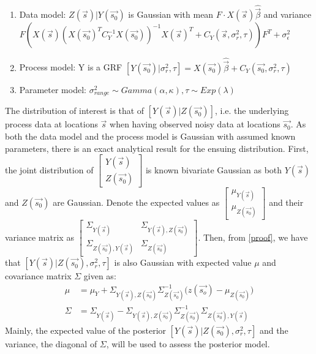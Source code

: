 \documentclass{report}
\begin{document}
\begin{enumerate}
\item Data model: $Z(\vec{s})|Y(\vec{s_0})$ is Gaussian with mean $F \cdot X(\vec{s})\hat{\vec{\beta}}$ and variance $F(X(\vec{s})(X(\vec{s_0})^{T}C_Y^{-1}X(\vec{s_0}))^{-1}X(\vec{s})^T + C_Y(\vec{s}, \sigma_{r}^2, \tau))F^T + \sigma_{\epsilon}^2$ 
\item Process model: Y is a GRF $[Y(\vec{s_0}) | \sigma_{r}^2, \tau]  = X(\vec{s_0})\hat{\vec{\beta}} + C_Y(\vec{s_0}, \sigma_{r}^2, \tau)$
\item Parameter model: $\sigma_{range}^2 \sim Gamma(\alpha, \kappa), \tau \sim Exp(\lambda)$ 
\end{enumerate}

The distribution of interest is that of $[Y(\vec{s}) | Z(\vec{s_0})]$, i.e. the underlying process data at locations $\vec{s}$ when having observed noisy data at locations $\vec{s_0}$. As both the data model and the process model is Gaussian with assumed known parameters, there is an exact analytical result for the ensuing distribution. First, the joint distribution of $\begin{bmatrix} Y(\vec{s}) \\ Z(\vec{s_0}) \end{bmatrix}$ is known bivariate Gaussian as both $ Y(\vec{s})$ and $Z(\vec{s_0})$ are Gaussian. Denote the expected values as $\begin{bmatrix} \mu_{Y(\vec{s})} \\ \mu_{Z(\vec{s_0})} \end{bmatrix}$ and their variance matrix as $\begin{bmatrix} \Sigma_{Y(\vec{s})} & \Sigma_{Y(\vec{s}), Z(\vec{s_0})} \\ \Sigma_{Z(\vec{s_0}), Y(\vec{s})} & \Sigma_{Z(\vec{s_0})} \end{bmatrix}$. Then, from \ref{proof}, we have that $[Y(\vec{s}) | Z(\vec{s_0}), \sigma_r^2, \tau]$ is also Gaussian with expected value $\mu$ and covariance matrix $\Sigma$ given as:
\begin{align*}
\mu &= \mu_Y + \Sigma_{Y(\vec{s}), Z(\vec{s_0})} \Sigma_{Z(\vec{s_0})}^{-1}\big(z(\vec{s_o}) - \mu_{Z(\vec{s_0})} \big)\\
\Sigma &= \Sigma_{Y(\vec{s})} - \Sigma_{Y(\vec{s}), Z(\vec{s_0})} \Sigma_{Z(\vec{s_0})}^{-1}\Sigma_{Z(\vec{s_0}), Y(\vec{s})}
\end{align*}
Mainly, the expected value of the posterior $[Y(\vec{s}) | Z(\vec{s_0}),\sigma_r^2, \tau]$ and the variance, the diagonal of $\Sigma$, will be used to assess the posterior model. \\
\end{document}
